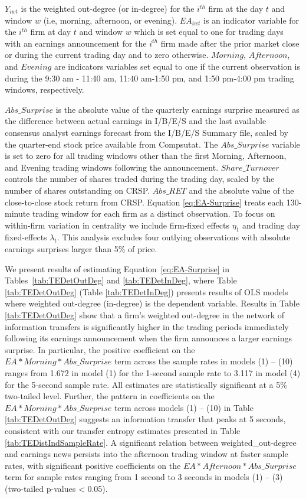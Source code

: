 \noindent \(Y_{iwt}\) is the weighted out-degree (or in-degree) for the \(i^{th}\) firm at the day \(t\) and window \(w\) (i.e, morning, afternoon, or evening).    \(EA_{iwt}\) is an indicator variable for the \(i^{th}\) firm at day \(t\) and window \(w\)  which is set equal to one for trading days with an earnings announcement for the \(i^{th}\) firm made after the prior market close or during the current trading day and to zero otherwise.   \(Morning\),  \(Afternoon\),  and \(Evening\) are indicators variables set equal to one if the current observation is during the 9:30 am - 11:40 am, 11:40 am-1:50 pm,  and 1:50 pm-4:00 pm trading windows, respectively.   

\(Abs\_Surprise\) is the absolute value of the quarterly earnings surprise measured as the difference between actual earnings in I/B/E/S and the last available consensus analyst earnings forecast from the I/B/E/S Summary file,  scaled by the quarter-end stock price available from Compsutat.  The \(Abs\_Surprise\) variable is set to zero for all trading windows other than the first Morning, Afternoon, and Evening trading windows following the announcement.   \(Share\_Turnover\) controls the number of shares traded during the trading day, scaled by the number of shares outstanding on CRSP.  \(Abs\_RET\) and the absolute value of the close-to-close stock return from CRSP.  Equation \ref{eq:EA-Surprise} treats each 130-minute trading window for each firm as a distinct observation.   To focus on within-firm variation in centrality we include firm-fixed effects \(\eta_1\) and trading day fixed-effects \(\lambda_t\). This analysis excludes four outlying observations with absolute earnings surprises larger than 5\% of price. 

We present results of estimating Equation~\ref{eq:EA-Surprise} in Tables~\ref{tab:TEDetOutDeg} and \ref{tab:TEDetInDeg},  where Table \ref{tab:TEDetOutDeg} (Table \ref{tab:TEDetInDeg}) presents results of OLS models where weighted out-degree (in-degree) is the dependent variable.   Results in Table \ref{tab:TEDetOutDeg} show that a firm’s weighted out-degree in the network of information transfers is significantly higher in the trading periods immediately following its earnings announcement when the firm announces a larger earnings surprise. In particular, the positive coefficient on the \(EA*Morning*Abs\_Surprise\) term across the sample rates in models (1) – (10) ranges from 1.672 in model (1) for the 1-second sample rate to 3.117 in model (4) for the 5-second sample rate.  All estimates are statistically significant at a 5\% two-tailed level.  Further, the pattern in coefficients on the \(EA*Morning*Abs\_Surprise\) term across models (1) – (10) in Table \ref{tab:TEDetOutDeg} suggests an information transfer that peaks at 5 seconds, consistent with our transfer entropy estimates presented in Table \ref{tab:TEDistIndSampleRate}.  A significant relation between weighted\_out-degree and earnings news persists into the afternoon trading window at faster sample rates, with significant positive coefficients on the \(EA*Afternoon*Abs\_Surprise\) term for sample rates ranging from 1 second to 3 seconds in models (1) – (3) (two-tailed p-values < 0.05). 

